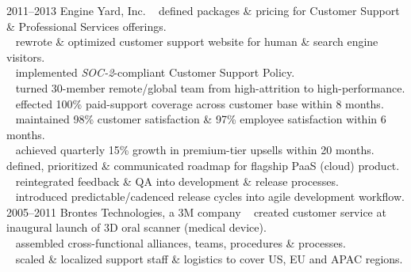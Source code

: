 \documentclass[]{friggeri-cv} %
\begin{document}
\begin{entrylist}
\entry
{2011--2013}
{Engine Yard, Inc.}
{}
{%
{\tiny {}} ~ defined packages \& pricing for Customer Support \& Professional Services offerings.\\
{\tiny {}} ~ rewrote \& optimized customer support website for human \& search engine visitors.\\
{\tiny {}} ~ implemented \emph{SOC-2}-compliant Customer Support Policy.\\
{\tiny {}} ~ turned 30-member remote/global team from high-attrition to high-performance.\\

{\tiny {}} ~ effected 100\% paid-support coverage across customer base within 8 months.\\
{\tiny {}} ~ maintained 98\% customer satisfaction \& 97\% employee satisfaction within 6 months.\\
{\tiny {}} ~ achieved quarterly 15\% growth in premium-tier upsells within 20 months.%
}
\entry
{}
{}
{}
{%
{\tiny {}} ~ defined, prioritized \& communicated roadmap for flagship PaaS (cloud) product.\\
{\tiny {}} ~ reintegrated feedback \& QA into development \& release processes.\\
{\tiny {}} ~ introduced predictable/cadenced release cycles into agile development workflow.\\%
}
\entry
{2005--2011}
{Brontes Technologies, a 3M company}
{}
{{\tiny {}} ~ created customer service at inaugural launch of 3D oral scanner (medical device).\\
{\tiny {}} ~ assembled cross-functional alliances, teams, procedures \& processes.\\
{\tiny {}} ~ scaled \& localized support staff \& logistics to cover US, EU and APAC regions.\\

}
\end{entrylist}
\end{document}
